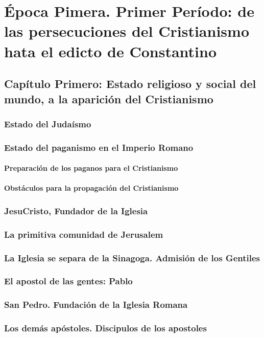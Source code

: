 \raggedbottom{} \documentclass[12pt]{book}
\begin{document}
\part{Época Pimera. Primer Período: de las persecuciones del Cristianismo hata el edicto de Constantino}
\chapter{Capítulo Primero: Estado religioso y social del mundo, a la aparición del Cristianismo}
\section{Estado del Judaísmo}
\section{Estado del paganismo en el Imperio Romano}
\subsection{Preparación de los paganos para el Cristianismo}
\subsection{Obstáculos para la propagación del Cristianismo}
\section{JesuCristo, Fundador de la Iglesia}
\section{La primitiva comunidad de Jerusalem}
\section{La Iglesia se separa de la Sinagoga. Admisión de los Gentiles}
\section{El apostol de las gentes: Pablo}
\section{San Pedro. Fundación de la Iglesia Romana}
\section{Los demás apóstoles. Discipulos de los apostoles}
\end{document}
